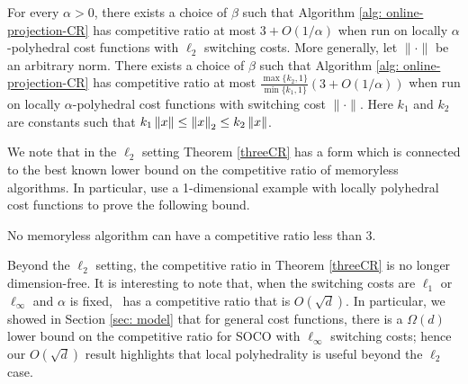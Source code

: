 


\begin{theorem}
\label{threeCR}
For every $\alpha > 0$, there exists a choice of $\beta$ such that Algorithm \ref{alg: online-projection-CR} has competitive ratio at most $3 + O(1/\alpha)$ when run on locally $\alpha$-polyhedral cost functions with $\ell_2$ switching costs. More generally, let $\| \cdot \|$ be an arbitrary norm. There exists a choice of $\beta$ such that Algorithm \ref{alg: online-projection-CR} has competitive ratio at most $\frac{\max\{k_2, 1\}}{\min\{k_1, 1\}} \left(3 + O(1/\alpha)\right)$ when run on locally $\alpha$-polyhedral cost functions with switching cost $\| \cdot \|$. Here  $k_1$ and $k_2$ are constants such that $k_1\left\lVert x \right\rVert \le \left\lVert x \right\rVert_2 \le k_2\left\lVert x \right\rVert$.  
\end{theorem}

We note that in the $\ell_2$ setting Theorem \ref{threeCR} has a form which is connected to the best known lower bound on the competitive ratio of memoryless algorithms. In particular, \cite{bansal2015} use a 1-dimensional example with locally polyhedral cost functions to prove the following bound. 

\begin{proposition} No memoryless algorithm can have a competitive ratio less than 3. 
\label{thm: lower-bound}
\end{proposition}


Beyond the $\ell_2$ setting, the competitive ratio in Theorem \ref{threeCR} is no longer dimension-free.  It is interesting to note that, when the switching costs are $\ell_1$ or $\ell_{\infty}$ and $\alpha$ is fixed, \ouralg\ has a competitive ratio that is $O(\sqrt{d})$. In particular, we showed in Section \ref{sec: model} that for general cost functions, there is a $\Omega(d)$ lower bound on the competitive ratio for SOCO with $\ell_{\infty}$ switching costs; hence our $O(\sqrt{d})$ result highlights that local polyhedrality is useful beyond the $\ell_2$ case.

